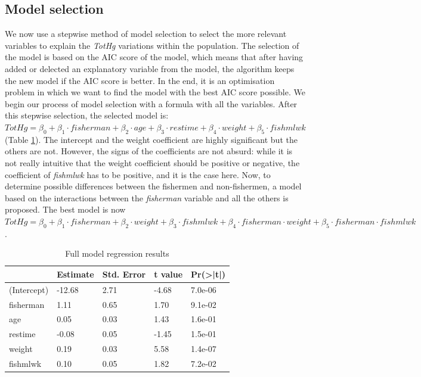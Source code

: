\documentclass[12pt,]{article}
\begin{document}
\subsection{Model selection}\label{model-selection}

We now use a stepwise method of model selection to select the more
relevant variables to explain the \emph{TotHg} variations within the
population. The selection of the model is based on the AIC score of the
model, which means that after having added or delected an explanatory
variable from the model, the algorithm keeps the new model if the AIC
score is better. In the end, it is an optimisation problem in which we
want to find the model with the best AIC score possible. We begin our
process of model selection with a formula with all the variables. After
this stepwise selection, the selected model is:
\(TotHg = \beta_0 + \beta_1 \cdot fisherman + \beta_2 \cdot age + \beta_3 \cdot restime + \beta_4 \cdot weight + \beta_5 \cdot fishmlwk\)
(Table \ref{tbl:fullmodel}). The intercept and the weight coefficient
are highly significant but the others are not. However, the signs of the
coefficients are not absurd: while it is not really intuitive that the
weight coefficient should be positive or negative, the coefficient of
\emph{fishmlwk} has to be positive, and it is the case here. Now, to
determine possible differences between the fishermen and non-fishermen,
a model based on the interactions between the \emph{fisherman} variable
and all the others is proposed. The best model is now
\(TotHg = \beta_0 + \beta_1 \cdot fisherman + \beta_2 \cdot weight + \beta_3 \cdot fishmlwk + \beta_4 \cdot fisherman \cdot weight + \beta_5 \cdot fisherman \cdot fishmlwk\).

\begin{table}[t]

\caption{\label{tab:unnamed-chunk-12}\label{tbl:fullmodel}Full model regression results}
\centering
\begin{tabular}{l|l|l|l|l}
\hline
  & Estimate & Std. Error & t value & Pr(>|t|)\\
\hline
\rowcolor{gray!6}  (Intercept) & -12.68 & 2.71 & -4.68 & 7.0e-06\\
\hline
fisherman & 1.11 & 0.65 & 1.70 & 9.1e-02\\
\hline
\rowcolor{gray!6}  age & 0.05 & 0.03 & 1.43 & 1.6e-01\\
\hline
restime & -0.08 & 0.05 & -1.45 & 1.5e-01\\
\hline
\rowcolor{gray!6}  weight & 0.19 & 0.03 & 5.58 & 1.4e-07\\
\hline
fishmlwk & 0.10 & 0.05 & 1.82 & 7.2e-02\\
\hline
\end{tabular}
\end{table}
\end{document}

